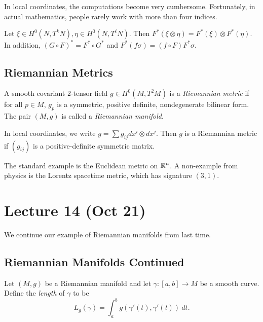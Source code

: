 \documentclass[twoside, 10pt]{article}
\begin{document}
    In local coordinates, the computations become very cumbersome. Fortunately, in actual mathematics, people rarely work with more than four indices.

    \begin{prop}
        Let $\xi \in H^0(N,T^kN), \eta \in H^0(N,T^{\ell}N)$. Then $F^*(\xi \otimes \eta) = F^*(\xi) \otimes F^*(\eta)$. In addition, $(G \circ F)^* = F^* \circ G^*$ and $F^*(f\sigma) = (f \circ F)F^*\sigma$.
    \end{prop}
        

    \subsection{Riemannian Metrics}%
    \label{ssub:riemannian_metrics}

    \begin{defn}
        A smooth covariant $2$-tensor field $g \in H^0(M,T^2M)$ is a \textit{Riemannian metric} if for all $p \in M$, $g_p$ is a symmetric, positive definite, nondegenerate bilinear form. The pair $(M,g)$ is called a \textit{Riemannian manifold}.
    \end{defn}
    
    In local coordinates, we write $g = \sum g_{ij} dx^i \otimes dx^j$. Then $g$ is a Riemannian metric if $(g_{ij})$ is a positive-definite symmetric matrix.

    \begin{exm}
        The standard example is the Euclidean metric on $\mathbb{R}^n$. A non-example from physics is the Lorentz spacetime metric, which has signature $(3,1)$.
    \end{exm}

    \section{Lecture 14 (Oct 21)}%
    \label{sec:lecture_14_oct_21}
    
    We continue our example of Riemannian manifolds from last time.

    \subsection{Riemannian Manifolds Continued}%
    \label{sec:riemannian_geometry_continued}
    
    \begin{defn}
        Let $(M,g)$ be a Riemannian manifold and let $\gamma:[a,b] \to M$ be a smooth curve. Define the \textit{length} of $\gamma$ to be
        \[ L_g(\gamma) = \int_a^b g(\gamma'(t),\gamma'(t))\ dt. \]
    \end{defn}
\end{document}
